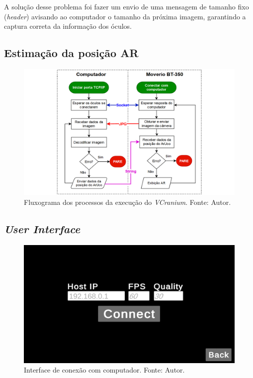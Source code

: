 

A solução desse problema foi fazer um envio de uma mensagem de tamanho fixo (\textit{header}) avisando ao computador o tamanho da próxima imagem, garantindo a captura correta da informação dos óculos.


\subsection{Estimação da posição AR}

\begin{figure}[ht]
    \centering
    \includegraphics[width=1\linewidth]{figuras/flowchart.png}
    \caption{Fluxograma dos processos da execução do \textit{VCranium}. Fonte: Autor.}
    \label{fig:flowchart}
\end{figure}

\subsection{\textit{User Interface}}

\begin{figure}[ht]
    \centering
    \includegraphics[width=.65\linewidth]{figuras/vcranium_connect.png}
    \caption{Interface de conexão com computador. Fonte: Autor.}
    \label{fig:vcranium-connect}
\end{figure}




